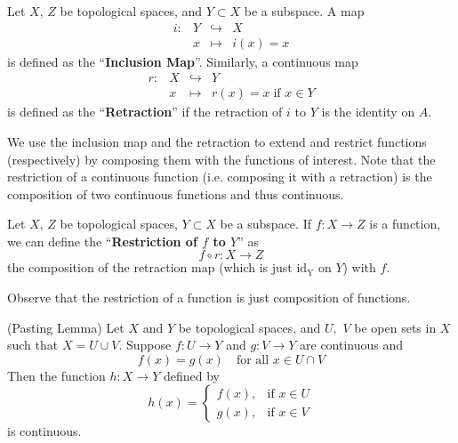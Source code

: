 \begin{defn}
Let $X$, $Z$ be topological spaces, and $Y\subset X$ be a subspace. A
map
\begin{equation}
\begin{array}{llll}
i:& Y & \hookrightarrow& X\\
  & x & \mapsto& i(x)=x
\end{array}
\end{equation}
is defined as the ``\textbf{Inclusion Map}''. Similarly, a continuous map
\begin{equation}
\begin{array}{llll}
r:& X & \hookrightarrow& Y\\
  & x & \mapsto& r(x)=x\;\text{if }x\in Y
\end{array}
\end{equation}
is defined as the ``\textbf{Retraction}'' if the retraction of $i$ to
$Y$ is the identity on $A$.
\end{defn}
\begin{rmk}
We use the inclusion map and the retraction to extend and restrict
functions (respectively) by composing them with the functions of
interest. Note that the restriction of a continuous function
(i.e. composing it with a retraction) is the composition of two
continuous functions and thus continuous.
\end{rmk}
\begin{defn}
Let $X$, $Z$ be topological spaces, $Y\subset X$ be a subspace.
If $f:X\to Z$ is a function, we can define the ``\textbf{Restriction
  of $f$ to $Y$}'' as
\begin{equation}
f\circ r:X\to Z
\end{equation}
the composition of the retraction map (which is just
$\operatorname{id_Y}$ on $Y$) with $f$. 
\end{defn}
\begin{rmk}
Observe that the restriction of a function is just composition of
functions.
\end{rmk}
\begin{lem}{(Pasting Lemma)}
Let $X$ and $Y$ be topological spaces, and $U,$ $V$ be open sets in
$X$ such that $X=U\cup V$. Suppose $f:U\to Y$ and $g:V\to Y$ are
continuous and 
\begin{equation}
f(x)=g(x)\quad\text{for all }x\in U\cap V
\end{equation}
Then the function $h:X\to Y$ defined by
\begin{equation}
h(x) = \begin{cases} f(x),&\text{if }x\in U\\
g(x),&\text{if }x\in V
\end{cases}
\end{equation}
is continuous.
\end{lem}
